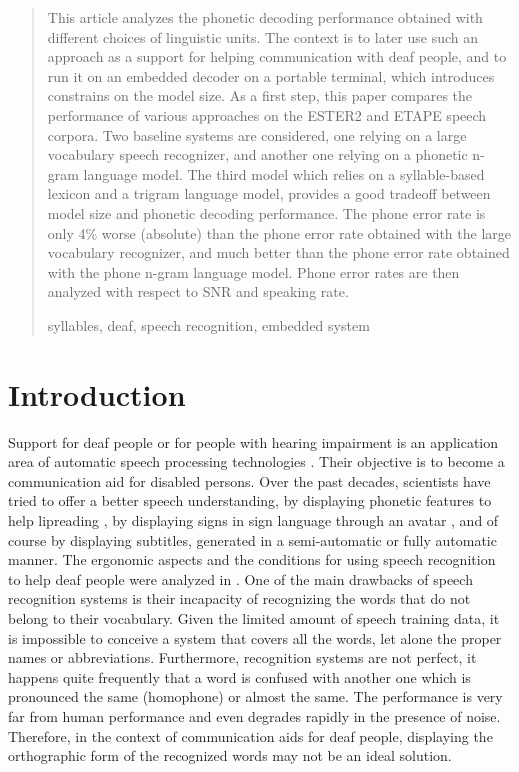 \documentclass[runningheads,a4paper]{llncs}
\newcommand{\keywords}[1]{\par\addvspace\baselineskip
\noindent\keywordname\enspace\ignorespaces#1}
\begin{document}
\begin{abstract}
This article analyzes the phonetic decoding performance obtained with different choices of linguistic units. The context is to later
use such an approach as a support for helping communication with deaf people, and to run it on an embedded decoder on a portable terminal,
which introduces constrains on the model size. As a first step, this paper compares the performance of various approaches on the ESTER2 and
ETAPE speech corpora. Two baseline systems are considered, one relying on a large vocabulary speech recognizer, and another one relying
on a phonetic n-gram language model. The third model which relies on a syllable-based lexicon and a trigram language model, provides a good
tradeoff between model size and phonetic decoding performance. The phone error rate is only 4\% worse (absolute) than the phone error rate
obtained with the large vocabulary recognizer, and much better than the phone error rate obtained with the phone n-gram language model. Phone
error rates are then analyzed with respect to SNR and speaking rate. 
\keywords{syllables, deaf, speech recognition, embedded system}
\end{abstract}


\section{Introduction}

Support for deaf people or for people with hearing impairment is an
application area of automatic speech processing technologies \cite{TSD1}.
Their objective is to become a communication aid for disabled persons.
Over the past decades, scientists have tried to offer a better speech
understanding, by displaying phonetic features to help lipreading
\cite{TSD2}, by displaying signs in sign language through an avatar
\cite{TSD3}, and of course by displaying subtitles, generated in
a semi-automatic or fully automatic manner. The ergonomic aspects
and the conditions for using speech recognition to help deaf people
were analyzed in \cite{TSD4}. One of the main drawbacks of speech
recognition systems is their incapacity of recognizing the words that
do not belong to their vocabulary. Given the limited amount of speech
training data, it is impossible to conceive a system that covers all
the words, let alone the proper names or abbreviations. Furthermore,
recognition systems are not perfect, it happens quite frequently that
a word is confused with another one which is pronounced the same (homophone)
or almost the same. The performance is very far from human performance
\cite{TSD5} and even degrades rapidly in the presence of noise. Therefore,
in the context of communication aids for deaf people, displaying the
orthographic form of the recognized words may not be an ideal solution. 
\end{document}
